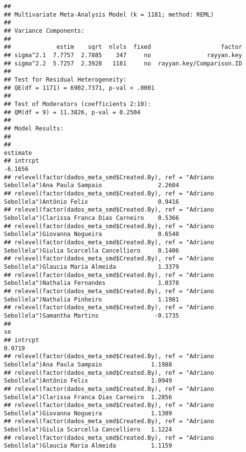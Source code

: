 \documentclass[
]{article}
\begin{document}
\begin{verbatim}
## 
## Multivariate Meta-Analysis Model (k = 1181; method: REML)
## 
## Variance Components:
## 
##             estim    sqrt  nlvls  fixed                    factor 
## sigma^2.1  7.7757  2.7885    347     no                rayyan.key 
## sigma^2.2  5.7257  2.3928   1181     no  rayyan.key/Comparison.ID 
## 
## Test for Residual Heterogeneity:
## QE(df = 1171) = 6902.7371, p-val < .0001
## 
## Test of Moderators (coefficients 2:10):
## QM(df = 9) = 11.3826, p-val = 0.2504
## 
## Model Results:
## 
##                                                                                                     estimate 
## intrcpt                                                                                              -6.1656 
## relevel(factor(dados_meta_smd$Created.By), ref = "Adriano Sebollela")Ana Paula Sampaio                2.2604 
## relevel(factor(dados_meta_smd$Created.By), ref = "Adriano Sebollela")Antônio Felix                    0.9416 
## relevel(factor(dados_meta_smd$Created.By), ref = "Adriano Sebollela")Clarissa Franca Dias Carneiro    0.5366 
## relevel(factor(dados_meta_smd$Created.By), ref = "Adriano Sebollela")Giovanna Nogueira                0.6540 
## relevel(factor(dados_meta_smd$Created.By), ref = "Adriano Sebollela")Giulia Scarcella Cancelliero     0.1406 
## relevel(factor(dados_meta_smd$Created.By), ref = "Adriano Sebollela")Glaucia Maria Almeida            1.3379 
## relevel(factor(dados_meta_smd$Created.By), ref = "Adriano Sebollela")Nathalia Fernandes               1.0378 
## relevel(factor(dados_meta_smd$Created.By), ref = "Adriano Sebollela")Nathalia Pinheiro                1.1981 
## relevel(factor(dados_meta_smd$Created.By), ref = "Adriano Sebollela")Samantha Martins                -0.1735 
##                                                                                                         se 
## intrcpt                                                                                             0.9719 
## relevel(factor(dados_meta_smd$Created.By), ref = "Adriano Sebollela")Ana Paula Sampaio              1.1988 
## relevel(factor(dados_meta_smd$Created.By), ref = "Adriano Sebollela")Antônio Felix                  1.0949 
## relevel(factor(dados_meta_smd$Created.By), ref = "Adriano Sebollela")Clarissa Franca Dias Carneiro  1.2856 
## relevel(factor(dados_meta_smd$Created.By), ref = "Adriano Sebollela")Giovanna Nogueira              1.1309 
## relevel(factor(dados_meta_smd$Created.By), ref = "Adriano Sebollela")Giulia Scarcella Cancelliero   1.1224 
## relevel(factor(dados_meta_smd$Created.By), ref = "Adriano Sebollela")Glaucia Maria Almeida          1.1159 

\end{verbatim}
\end{document}
